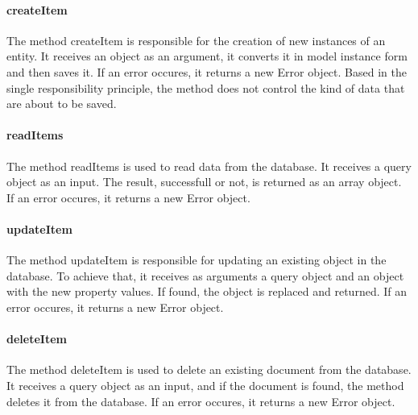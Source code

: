 \paragraph{createItem}
The method createItem is responsible for the creation of new instances of an entity. It receives an object as an argument, it converts it in model instance form and then saves it. If an error occures, it returns a new Error object. Based in the single responsibility principle, the method does not control the kind of data that are about to be saved.
\paragraph{readItems}
The method readItems is used to read data from the database. It receives a query object as an input. The result, successfull or not, is returned as an array object. If an error occures, it returns a new Error object.
\paragraph{updateItem}
The method updateItem is responsible for updating an existing object in the database. To achieve that, it receives as arguments a query object and an object with the new property values. If found, the object is replaced and returned. If an error occures, it returns a new Error object.
\paragraph{deleteItem}
The method deleteItem is used to delete an existing document from the database. It receives a query object as an input, and if the document is found, the method deletes it from the database. If an error occures, it returns a new Error object.


